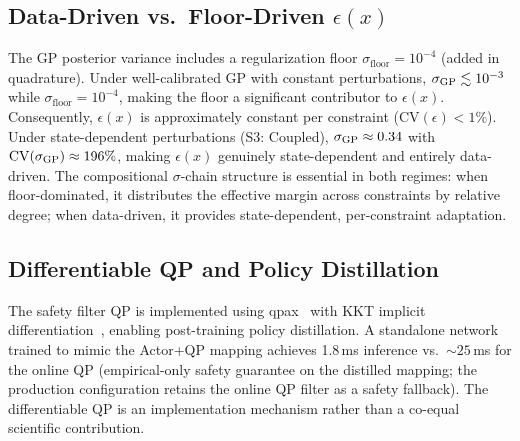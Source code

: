 \subsection{Data-Driven vs.\ Floor-Driven $\epsilon(x)$}

The GP posterior variance includes a regularization floor $\sigma_{\mathrm{floor}} = 10^{-4}$ (added in quadrature). Under well-calibrated GP with constant perturbations, $\sigma_{\mathrm{GP}} \lesssim 10^{-3}$ while $\sigma_{\mathrm{floor}} = 10^{-4}$, making the floor a significant contributor to $\epsilon(x)$. Consequently, $\epsilon(x)$ is approximately constant per constraint ($\mathrm{CV}(\epsilon) < 1\%$). Under state-dependent perturbations (S3: Coupled), $\sigma_{\mathrm{GP}} \approx 0.34$ with $\mathrm{CV}(\sigma_{\mathrm{GP}}) \approx 196\%$, making $\epsilon(x)$ genuinely state-dependent and entirely data-driven. The compositional $\sigma$-chain structure is essential in both regimes: when floor-dominated, it distributes the effective margin across constraints by relative degree; when data-driven, it provides state-dependent, per-constraint adaptation.

\subsection{Differentiable QP and Policy Distillation}

The safety filter QP is implemented using qpax~\cite{howell2024qpax} with KKT implicit differentiation~\cite{amos2017optnet}, enabling post-training policy distillation. A standalone network trained to mimic the Actor+QP mapping achieves 1.8\,ms inference vs.\ ${\sim}25$\,ms for the online QP (empirical-only safety guarantee on the distilled mapping; the production configuration retains the online QP filter as a safety fallback). The differentiable QP is an implementation mechanism rather than a co-equal scientific contribution.

